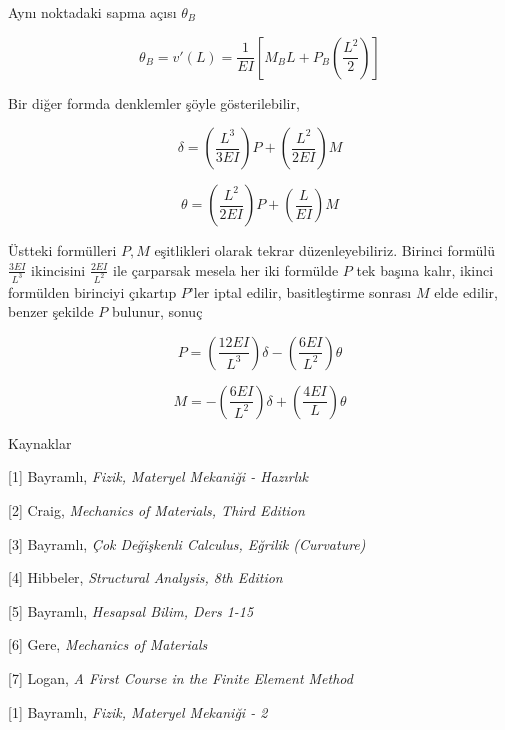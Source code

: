 \documentclass[12pt,fleqn]{article}\usepackage{../../common}
\begin{document}
Aynı noktadaki sapma açısı $\theta_B$

$$
\theta_B = v'(L) =
\frac{1}{EI} \left[
M_B L + P_B \left( \frac{L^2}{2} \right) 
\right]
$$

Bir diğer formda denklemler şöyle gösterilebilir,

$$
\delta = \left( \frac{L^3}{3EI} \right) P +
\left( \frac{L^2}{2EI} \right) M
$$

$$
\theta = \left( \frac{L^2}{2EI} \right) P +
\left( \frac{L}{EI} \right) M
$$

Üstteki formülleri $P,M$ eşitlikleri olarak tekrar düzenleyebiliriz.
Birinci formülü $\frac{3EI}{L^3}$ ikincisini $\frac{2EI}{L^2}$ ile
çarparsak mesela her iki formülde $P$ tek başına kalır, ikinci formülden
birinciyi çıkartıp $P$'ler iptal edilir, basitleştirme sonrası $M$ elde
edilir, benzer şekilde $P$ bulunur, sonuç

$$
P = \left( \frac{12EI}{L^3}  \right) \delta -
\left(  \frac{6EI}{L^2} \right) \theta
$$

$$
M = - \left( \frac{6 EI}{L^2}  \right) \delta +
\left( \frac{4 EI}{L}  \right) \theta
$$

Kaynaklar

[1] Bayramlı, {\em Fizik, Materyel Mekaniği - Hazırlık}

[2] Craig, {\em Mechanics of Materials, Third Edition}

[3] Bayramlı, {\em Çok Değişkenli Calculus, Eğrilik (Curvature)}

[4] Hibbeler, {\em Structural Analysis, 8th Edition}

[5] Bayramlı, {\em Hesapsal Bilim, Ders 1-15}

[6] Gere, {\em Mechanics of Materials}

[7] Logan, {\em A First Course in the Finite Element Method}

[1] Bayramlı, {\em Fizik, Materyel Mekaniği - 2}
\end{document}

